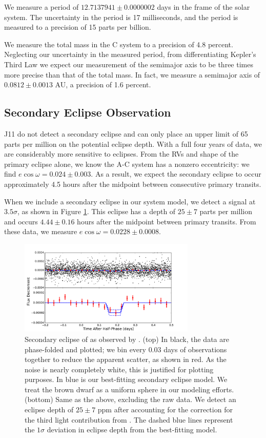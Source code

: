 We measure a period of $12.7137941 \pm 0.0000002$ days in the frame of the solar system. 
The uncertainty in the period is 17 milliseconds, and the period is measured to a precision of 15 parts per billion.

We measure the total mass in the \LA C system to a precision of 4.8 percent. 
Neglecting our uncertainty in the measured period, from differentiating Kepler's Third Law we expect our measurement of the semimajor axis to be three times more precise than that of the total mass.
In fact, we measure a semimajor axis of $0.0812 \pm 0.0013$ AU, a precision of 1.6 percent.


\subsection{Secondary Eclipse Observation}

J11 do not detect a secondary eclipse and can only place an upper limit of 65 parts per million on the potential eclipse depth.
With a full four years of \itk{} data, we are considerably more sensitive to eclipses.
From the RVs and shape of the primary eclipse alone, we know the A-C system has a nonzero eccentricity: we find $e \cos \omega = 0.024 \pm 0.003$.
As a result, we expect the secondary eclipse to occur approximately 4.5 hours after the midpoint between consecutive primary transits. 

When we include a secondary eclipse in our system model, we detect a signal at $3.5\sigma$, as shown in Figure \ref{SecondaryPlot}.
This eclipse has a depth of $25 \pm 7$ parts per million and occurs $4.44 \pm 0.16$ hours after the midpoint between primary transits.
From these data, we measure $e \cos \omega = 0.0228 \pm 0.0008$.


\begin{figure}[htbp]
\centerline{\includegraphics[width=0.75\textwidth]{chapter4/f6.pdf}}
\caption[Secondary eclipse of \LC{} as observed by \itk]{Secondary eclipse of \LC{} as observed by \itk. 
(top) In black, the \itk{} data are phase-folded and plotted; we bin every 0.03 days of observations together to reduce the apparent scatter, as shown in red. 
As the noise is nearly completely white, this is justified for plotting purposes.
In blue is our best-fitting secondary eclipse model.
We treat the brown dwarf as a uniform sphere in our modeling efforts.
(bottom) Same as the above, excluding the raw data. 
We detect an eclipse depth of $25 \pm 7$ ppm after accounting for the correction for the third light contribution from \LB.
The dashed blue lines represent the $1\sigma$ deviation in eclipse depth from the best-fitting model.
}
\label{SecondaryPlot}
\end{figure}




